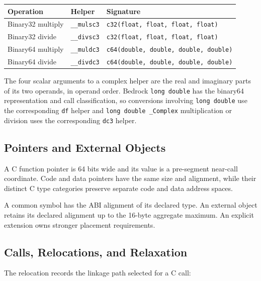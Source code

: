 \documentclass[10pt,twoside]{article}
\begin{document}
\begingroup\footnotesize
\setlength{\tabcolsep}{2pt}
\begin{longtable}{@{}p{1.55in}p{1.55in}p{2.45in}@{}}
\toprule
\textbf{Operation} & \textbf{Helper} & \textbf{Signature}\\
\midrule
\endhead
Binary32 multiply & \texttt{\_\allowbreak{}\_\allowbreak{}mulsc3} & \texttt{c32(float, float, float, float)}\\
Binary32 divide & \texttt{\_\allowbreak{}\_\allowbreak{}divsc3} & \texttt{c32(float, float, float, float)}\\
Binary64 multiply & \texttt{\_\allowbreak{}\_\allowbreak{}muldc3} & \texttt{c64(double, double, double, double)}\\
Binary64 divide & \texttt{\_\allowbreak{}\_\allowbreak{}divdc3} & \texttt{c64(double, double, double, double)}\\
\bottomrule
\end{longtable}
\endgroup

The four scalar arguments to a complex helper are the real and imaginary parts
of its two operands, in operand order. Bedrock \texttt{long double} has the
binary64 representation and call classification, so conversions involving
\texttt{long double} use the corresponding \texttt{df} helper and
\texttt{long double \_Complex} multiplication or division uses the
corresponding \texttt{dc3} helper.

\subsection{Pointers and External Objects}
A C function pointer is 64 bits wide and its value is a pre-segment near-call
coordinate. Code and data pointers have the
same size and alignment, while their distinct C type categories preserve
separate code and data address spaces.

A common symbol has the ABI alignment of its declared type. An external
object retains its declared alignment up to the 16-byte aggregate maximum.
An explicit extension owns stronger placement requirements.

\subsection{Calls, Relocations, and Relaxation}
The relocation records the linkage path selected for a C call:


\end{document}
